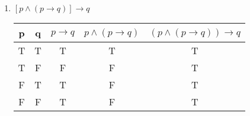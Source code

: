 \documentclass[11pt]{article}
\begin{document}
\begin{enumerate}
\begin{enumerate}[label=(\alph*)]
\begin{center}
    \end{center}
    \item $[p \land (p \rightarrow q)] \rightarrow q$
    \begin{center}
        \begin{tabular}{|c|c|c|c|c|}
            \hline
            p & q & $p\rightarrow q$ & $p\land(p\rightarrow q)$ & $(p\land(p\rightarrow q))\rightarrow q$  \\
            \hline
            T & T & T & T & T \\
            T & F & F & F & T \\
            F & T & T & F & T \\
            F & F & T & F & T \\
            \hline
        \end{tabular}
    \end{center}
\end{enumerate}
\end{enumerate}
\end{document}
